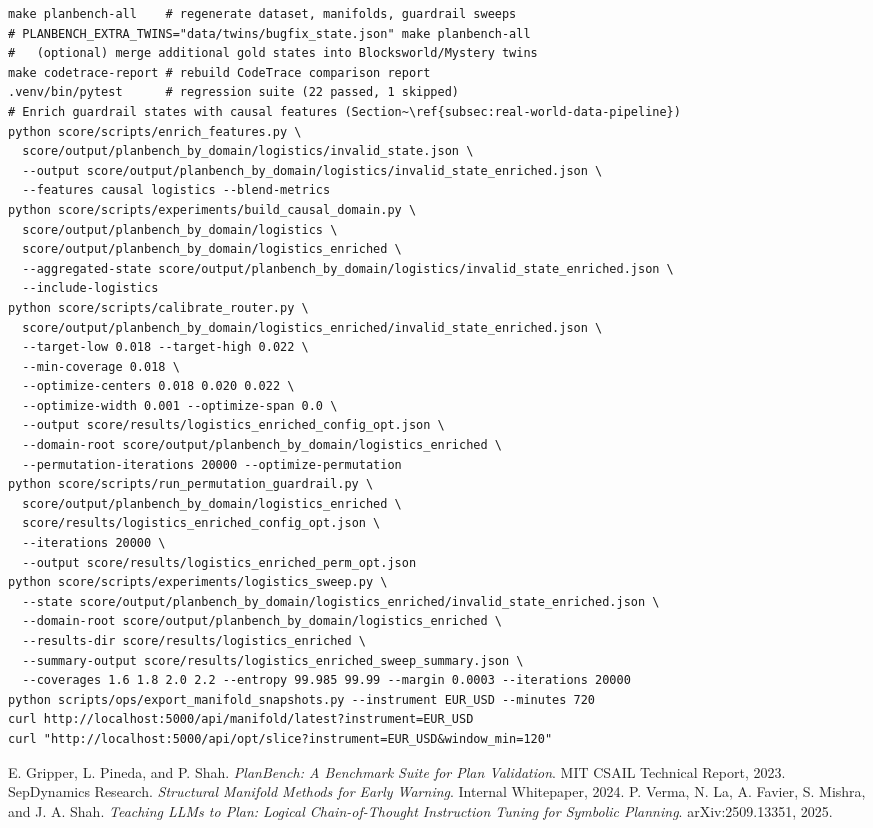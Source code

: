 \documentclass[11pt]{article}
\begin{document}
\begin{lstlisting}[style=stm]
make planbench-all    # regenerate dataset, manifolds, guardrail sweeps
# PLANBENCH_EXTRA_TWINS="data/twins/bugfix_state.json" make planbench-all
#   (optional) merge additional gold states into Blocksworld/Mystery twins
make codetrace-report # rebuild CodeTrace comparison report
.venv/bin/pytest      # regression suite (22 passed, 1 skipped)
# Enrich guardrail states with causal features (Section~\ref{subsec:real-world-data-pipeline})
python score/scripts/enrich_features.py \
  score/output/planbench_by_domain/logistics/invalid_state.json \
  --output score/output/planbench_by_domain/logistics/invalid_state_enriched.json \
  --features causal logistics --blend-metrics
python score/scripts/experiments/build_causal_domain.py \
  score/output/planbench_by_domain/logistics \
  score/output/planbench_by_domain/logistics_enriched \
  --aggregated-state score/output/planbench_by_domain/logistics/invalid_state_enriched.json \
  --include-logistics
python score/scripts/calibrate_router.py \
  score/output/planbench_by_domain/logistics_enriched/invalid_state_enriched.json \
  --target-low 0.018 --target-high 0.022 \
  --min-coverage 0.018 \
  --optimize-centers 0.018 0.020 0.022 \
  --optimize-width 0.001 --optimize-span 0.0 \
  --output score/results/logistics_enriched_config_opt.json \
  --domain-root score/output/planbench_by_domain/logistics_enriched \
  --permutation-iterations 20000 --optimize-permutation
python score/scripts/run_permutation_guardrail.py \
  score/output/planbench_by_domain/logistics_enriched \
  score/results/logistics_enriched_config_opt.json \
  --iterations 20000 \
  --output score/results/logistics_enriched_perm_opt.json
python score/scripts/experiments/logistics_sweep.py \
  --state score/output/planbench_by_domain/logistics_enriched/invalid_state_enriched.json \
  --domain-root score/output/planbench_by_domain/logistics_enriched \
  --results-dir score/results/logistics_enriched \
  --summary-output score/results/logistics_enriched_sweep_summary.json \
  --coverages 1.6 1.8 2.0 2.2 --entropy 99.985 99.99 --margin 0.0003 --iterations 20000
python scripts/ops/export_manifold_snapshots.py --instrument EUR_USD --minutes 720
curl http://localhost:5000/api/manifold/latest?instrument=EUR_USD
curl "http://localhost:5000/api/opt/slice?instrument=EUR_USD&window_min=120"
\end{lstlisting}

\begin{thebibliography}{9}
\bibitem{planbench} E. Gripper, L. Pineda, and P. Shah. \emph{PlanBench: A Benchmark Suite for Plan Validation}. MIT CSAIL Technical Report, 2023.
\bibitem{stm-manifold} SepDynamics Research. \emph{Structural Manifold Methods for Early Warning}. Internal Whitepaper, 2024.
\bibitem{verma2025pddlinstruct} P. Verma, N. La, A. Favier, S. Mishra, and J. A. Shah. \emph{Teaching LLMs to Plan: Logical Chain-of-Thought Instruction Tuning for Symbolic Planning}. arXiv:2509.13351, 2025.
\end{thebibliography}
\end{document}
